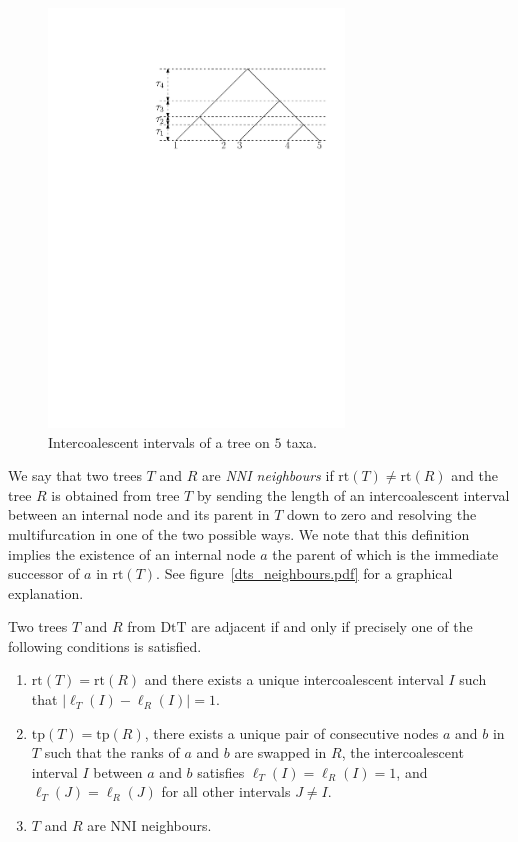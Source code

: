 \documentclass{amsart}
\newcommand{\dts}{\mathrm{DtT}}
\newcommand{\rt}{\mathrm{rt}}
\newcommand{\tp}{\mathrm{tp}}
\begin{document}
\begin{figure}
\centering
\includegraphics[width=0.7\textwidth]{T5.pdf}
\caption{Intercoalescent intervals of a tree on $5$ taxa.}
\label{T5.pdf}
\end{figure}

We say that two trees $T$ and $R$ are {\em NNI neighbours} if $\rt(T) \ne \rt(R)$ and the tree $R$ is obtained from tree $T$ by sending the length of an intercoalescent interval between an internal node and its parent in $T$ down to zero and resolving the multifurcation in one of the two possible ways.
We note that this definition implies the existence of an internal node $a$ the parent of which is the immediate successor of $a$ in $\rt(T)$.
See figure~\ref{dts_neighbours.pdf} for a graphical explanation.

Two trees $T$ and $R$ from $\dts$ are adjacent if and only if precisely one of the following conditions is satisfied.
\begin{enumerate}[(1)]
\item $\rt(T) = \rt(R)$ and there exists a unique intercoalescent interval $I$ such that $|\ell_T(I) - \ell_R(I)| = 1$.
\item $\tp(T) = \tp(R)$, there exists a unique pair of consecutive nodes $a$ and $b$ in $T$ such that the ranks of $a$ and $b$ are swapped in $R$, the intercoalescent interval $I$ between $a$ and $b$ satisfies $\ell_T(I) = \ell_R(I) = 1$, and $\ell_T(J) = \ell_R(J)$ for all other intervals $J \ne I$.
\item $T$ and $R$ are NNI neighbours.
\end{enumerate}
\end{document}
